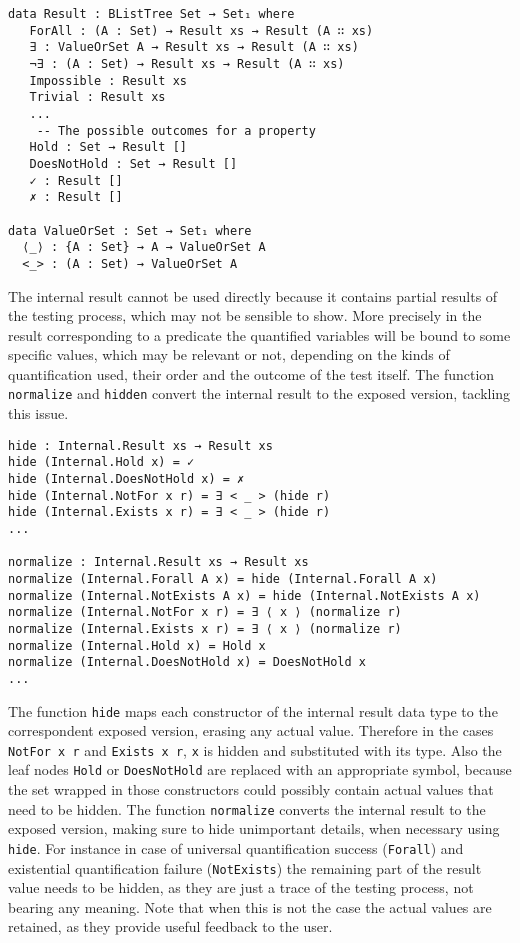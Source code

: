 \documentclass[10pt,a4paper]{article}
\begin{document}
\begin{verbatim}
data Result : BListTree Set → Set₁ where
   ForAll : (A : Set) → Result xs → Result (A ∷ xs)
   ∃ : ValueOrSet A → Result xs → Result (A ∷ xs)
   ¬∃ : (A : Set) → Result xs → Result (A ∷ xs)
   Impossible : Result xs
   Trivial : Result xs
   ...
    -- The possible outcomes for a property
   Hold : Set → Result []
   DoesNotHold : Set → Result []
   ✓ : Result []
   ✗ : Result []
   
data ValueOrSet : Set → Set₁ where
  ⟨_⟩ : {A : Set} → A → ValueOrSet A
  <_> : (A : Set) → ValueOrSet A

\end{verbatim}

The internal result cannot be used directly because it contains partial results of the testing process, which may not be sensible to show.
More precisely in the result corresponding to a predicate the quantified variables will be bound to some specific values, which may be relevant or not, depending on the kinds of quantification used, their order and the outcome of the test itself.
The function \texttt{normalize} and \texttt{hidden} convert the internal result to the exposed version, tackling this issue.


\begin{verbatim}
hide : Internal.Result xs → Result xs
hide (Internal.Hold x) = ✓
hide (Internal.DoesNotHold x) = ✗
hide (Internal.NotFor x r) = ∃ < _ > (hide r)
hide (Internal.Exists x r) = ∃ < _ > (hide r)
...

normalize : Internal.Result xs → Result xs
normalize (Internal.Forall A x) = hide (Internal.Forall A x)
normalize (Internal.NotExists A x) = hide (Internal.NotExists A x)
normalize (Internal.NotFor x r) = ∃ ⟨ x ⟩ (normalize r)
normalize (Internal.Exists x r) = ∃ ⟨ x ⟩ (normalize r)
normalize (Internal.Hold x) = Hold x
normalize (Internal.DoesNotHold x) = DoesNotHold x
...
\end{verbatim}
The function \texttt{hide} maps each constructor of the internal result data type to the correspondent exposed version, erasing any actual value.
Therefore in the cases \texttt{NotFor x r} and \texttt{Exists x r}, \texttt{x} is hidden and substituted with its type. 
Also the leaf nodes \texttt{Hold} or \texttt{DoesNotHold} are replaced with an appropriate symbol, because the set wrapped in those constructors could possibly contain actual values that need to be hidden.
The function \texttt{normalize} converts the internal result to the exposed version, making sure to hide unimportant details, when necessary using \texttt{hide}. For instance in case of universal quantification success (\texttt{Forall}) and existential quantification failure (\texttt{NotExists}) the remaining part of the result value needs to be hidden, as they are just a trace of the testing process, not bearing any meaning.
Note that when this is not the case the actual values are retained, as they provide useful feedback to the user.
\end{document}

